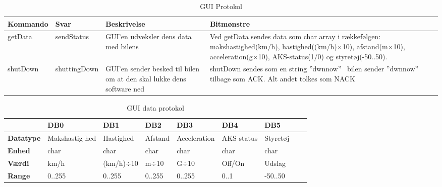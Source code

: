 \begin{table}[ht]
\begin{tabularx}{\textwidth}{| Z | Z | Z | Z |} \hline

\textbf{Kommando} 						&
\textbf{Svar}							&
\textbf{Beskrivelse}					&
\textbf{Bitmønstre}						\\ \hline

getData &

sendStatus &

GUI'en udveksler dens data med bilens &

Ved getData sendes data som char array i rækkefølgen: makshastighed(km/h), hastighed((km/h)$\times$10), afstand(m$\times$10), acceleration(g$\times$10), AKS-status(1/0) og styretøj(-50..50). \\ \hline



shutDown &

shuttingDown &

GUI'en sender besked til bilen om at den skal lukke dens software ned &

shutDown sendes som en string ''dwnnow'' \
bilen sender ''dwnnow'' tilbage som ACK. Alt andet tolkes som NACK \\ \hline

\end{tabularx}
\caption{GUI Protokol}
\label{tbl:prt_gui}
\end{table}



\begin{table}[ht]
\begin{tabularx}{\textwidth}{| Z | Z | Z | Z | Z | Z | Z | Z | Z |} \hline

\textbf{}	&
\textbf{DB0}	&
\textbf{DB1}	&
\textbf{DB2}	&
\textbf{DB3}	&
\textbf{DB4}	&
\textbf{DB5}	\\ \hline

\textbf{Datatype} & Makshastig hed & Hastighed & Afstand & Acceleration & AKS-status & Styretøj \\ \hline
\textbf{Enhed} & char & char & char & char & char &  char \\ \hline
\textbf{Værdi} & km/h & (km/h)$\div$10 & m$\div$10 & G$\div$10 & Off/On & Udslag \\ \hline
\textbf{Range} & 0..255 & 0..255 & 0..255 & 0..255 & 0..1 & -50..50 \\ \hline

\end{tabularx}
\caption{GUI data protokol}
\label{tbl:prt_gui_byte}
\end{table}

